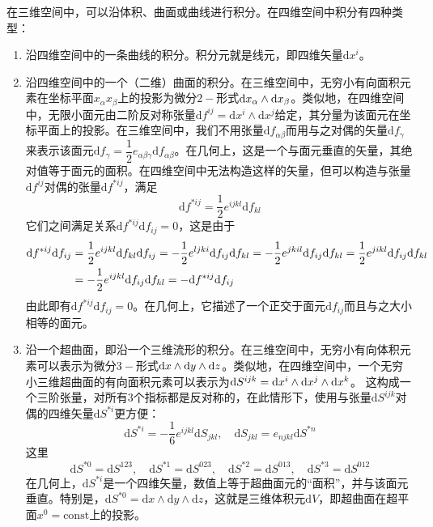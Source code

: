 在三维空间中，可以沿体积、曲面或曲线进行积分。在四维空间中积分有四种类型：
\begin{enumerate}
\item 沿四维空间中的一条曲线的积分。积分元就是线元，即四维矢量$\mathrm{d}x^i$。

\item 沿四维空间中的一个（二维）曲面的积分。在三维空间中，无穷小有向面积元素在坐标平面$x_\alpha x_\beta$上的投影为微分$2-$形式$\mathrm{d} x_\alpha \wedge \mathrm{d} x_\beta$。类似地，在四维空间中，无限小面元由二阶反对称张量$\mathrm{d}f^{ij}=\mathrm{d} x^i \wedge \mathrm{d}x^j$给定，其分量为该面元在坐标平面上的投影。在三维空间中，我们不用张量$\mathrm{d}f_{\alpha\beta}$而用与之对偶的矢量$\mathrm{d}f_\gamma$来表示该面元$\mathrm{d}f_\gamma = \dfrac12 e_{\alpha\beta\gamma} \mathrm{d}f_{\alpha\beta}$。在几何上，这是一个与面元垂直的矢量，其绝对值等于面元的面积。在四维空间中无法构造这样的矢量，但可以构造与张量$\mathrm{d}f^{ij}$对偶的张量$\mathrm{d}f^{*ij}$，满足
\begin{equation}
	\mathrm{d}f^{*ij} = \frac12 e^{ijkl}\mathrm{d}f_{kl}
\end{equation}
它们之间满足关系$\mathrm{d}f^{*ij}\mathrm{d}f_{ij} = 0$，这是由于%
\begin{align*}
	\mathrm{d}f^{*ij}\mathrm{d}f_{ij} & = \frac12 e^{ijkl}\mathrm{d}f_{kl} \mathrm{d} f_{ij} = -\frac12 e^{ljki} \mathrm{d} f_{ij}\mathrm{d}f_{kl} = -\frac12 e^{jkil} \mathrm{d} f_{ij}\mathrm{d}f_{kl} = \frac12 e^{jikl} \mathrm{d} f_{ij}\mathrm{d}f_{kl} \\
	& = -\frac12 e^{ijkl} \mathrm{d} f_{ij}\mathrm{d} f_{kl} = -\mathrm{d}f^{*ij}\mathrm{d}f_{ij}
\end{align*}
由此即有$\mathrm{d}f^{*ij}\mathrm{d}f_{ij} = 0$。在几何上，它描述了一个正交于面元$\mathrm{d}f_{ij}$而且与之大小相等的面元。

\item 沿一个超曲面，即沿一个三维流形的积分。在三维空间中，无穷小有向体积元素可以表示为微分$3-$形式$\mathrm{d} x\wedge \mathrm{d} y\wedge \mathrm{d} z$。类似地，在四维空间中，一个无穷小三维超曲面的有向面积元素可以表示为$\mathrm{d} S^{ijk} = \mathrm{d} x^i\wedge \mathrm{d} x^j \wedge \mathrm{d} x^k$。
这构成一个三阶张量，对所有3个指标都是反对称的，在此情形下，使用与张量$\mathrm{d}S^{ijk}$对偶的四维矢量$\mathrm{d}S^{*i}$更方便：
\begin{equation}
	\mathrm{d}S^{*i} = -\frac16 e^{ijkl} \mathrm{d}S_{jkl},\quad \mathrm{d}S_{jkl} = e_{njkl}\mathrm{d}S^{*n}
\end{equation}
这里
\begin{equation*}
	\mathrm{d}S^{*0} = \mathrm{d}S^{123},\quad \mathrm{d}S^{*1} = \mathrm{d}S^{023},\quad \mathrm{d}S^{*2} = \mathrm{d}S^{013},\quad \mathrm{d}S^{*3} = \mathrm{d}S^{012}
\end{equation*}
在几何上，$\mathrm{d}S^{*i}$是一个四维矢量，数值上等于超曲面元的“面积”，并与该面元垂直。特别是，$\mathrm{d}S^{*0} = \mathrm{d}x\wedge \mathrm{d}y \wedge \mathrm{d}z$，这就是三维体积元$\mathrm{d}V$，即超曲面在超平面$x^0=\text{const}$上的投影。


\end{enumerate}
